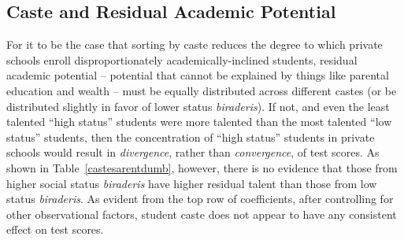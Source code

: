 \documentclass[Eubank_pk_ethnic_sorting.tex]{subfiles}
\begin{document}



\subsection{Caste and Residual Academic Potential}\label{residual_potential}

For it to be the case that sorting by caste reduces the degree to which private schools enroll disproportionately academically-inclined students, residual academic potential -- potential that cannot be explained by things like parental education and wealth -- must be equally distributed across different castes (or be distributed slightly in favor of lower status \emph{biraderis}). If not, and even the least talented ``high status'' students were more talented than the most talented ``low status'' students, then the concentration of ``high status'' students in private schools would result in \emph{divergence}, rather than \emph{convergence}, of test scores. As shown in Table~\ref{castesarentdumb}, however, there is no evidence that those from higher social status \emph{biraderis} have higher residual talent than those from low status \emph{biraderis}. As evident from the top row of coefficients, after controlling for other observational factors, student caste does not appear to have any consistent effect on test scores.


\end{document}
